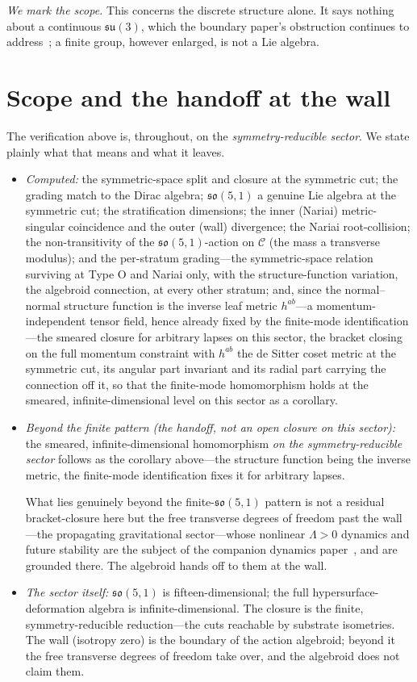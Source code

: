 \documentclass[11pt,a4paper]{article}
\theoremstyle{plain}
\theoremstyle{definition}
\theoremstyle{remark}
\newcommand{\so}{\mathfrak{so}}
\newcommand{\C}{\mathcal{C}}
\newcommand{\su}{\mathfrak{su}}
\begin{document}
\emph{We mark the scope.} This concerns the discrete structure alone. It says nothing about a continuous
$\su(3)$, which the boundary paper's obstruction continues to
address~\cite{JanzenBoundary}; a finite group, however enlarged, is not a Lie algebra.

\section{Scope and the handoff at the wall}\label{sec:scope}

The verification above is, throughout, on the \emph{symmetry-reducible sector}. We state plainly what that means and what it leaves.
\begin{itemize}
\item \emph{Computed:} the symmetric-space split and closure at the symmetric cut; the grading match to the Dirac algebra; $\so(5,1)$ a genuine Lie algebra at the symmetric cut; the stratification dimensions; the inner (Nariai) metric-singular coincidence and the outer (wall) divergence; the Nariai root-collision; the non-transitivity of the $\so(5,1)$-action on $\C$ (the mass a transverse modulus); and the per-stratum grading---the symmetric-space relation surviving at Type O and Nariai only, with the structure-function variation, the algebroid connection, at every other stratum; and, since the normal--normal structure function is the inverse leaf metric $h^{ab}$---a momentum-independent tensor field, hence already fixed by the finite-mode identification---the smeared closure for arbitrary lapses on this sector, the bracket closing on the full momentum constraint with $h^{ab}$ the de Sitter coset metric at the symmetric cut, its angular part invariant and its radial part carrying the connection off it, so that the finite-mode homomorphism holds at the smeared, infinite-dimensional level on this sector as a corollary.
\item \emph{Beyond the finite pattern (the handoff, not an open closure on this sector):} the smeared, infinite-dimensional homomorphism \emph{on the symmetry-reducible sector} follows as the corollary above---the structure function being the inverse metric, the finite-mode identification fixes it for arbitrary lapses. 

What lies genuinely beyond the finite-$\so(5,1)$ pattern is not a residual bracket-closure here but the free transverse degrees of freedom past the wall---the propagating gravitational sector---whose nonlinear $\Lambda>0$ dynamics and future stability are the subject of the companion dynamics paper~\cite{JanzenDynamics}, and are grounded there. The algebroid hands off to them at the wall.
\item \emph{The sector itself:} $\so(5,1)$ is fifteen-dimensional; the full hypersurface-deformation algebra is infinite-dimensional. The closure is the finite, symmetry-reducible reduction---the cuts reachable by substrate isometries. The wall (isotropy zero) is the boundary of the action algebroid; beyond it the free transverse degrees of freedom take over, and the algebroid does not claim them.
\end{itemize}
\end{document}
